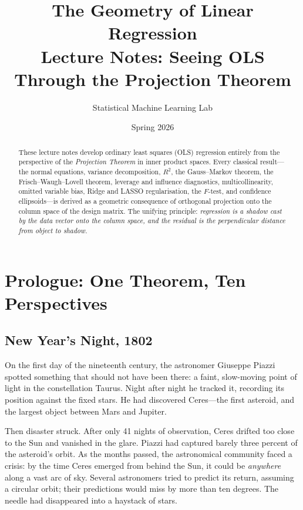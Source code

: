 \documentclass[11pt,a4paper]{article}
\title{%
  \textbf{The Geometry of Linear Regression}\\[6pt]
  \large Lecture Notes: Seeing OLS Through the Projection Theorem\\[4pt]
  \vspace{0.5em}{\large\itshape Supplementary notes for the lecture on linear regression}
}
\author{Statistical Machine Learning Lab}
\date{Spring 2026}
\theoremstyle{plain}
\theoremstyle{definition}
\begin{document}
\maketitle
\thispagestyle{fancy}

\begin{abstract}
These lecture notes develop ordinary least squares (OLS) regression entirely
from the perspective of the \emph{Projection Theorem} in inner product spaces.
Every classical result---the normal equations, variance decomposition,
$R^2$, the Gauss--Markov theorem, the Frisch--Waugh--Lovell theorem,
leverage and influence diagnostics, multicollinearity, omitted variable
bias, Ridge and LASSO regularisation, the $F$-test, and confidence
ellipsoids---is derived as a geometric consequence of orthogonal
projection onto the column space of the design matrix.
The unifying principle: \emph{regression is a shadow cast by the data vector
onto the column space, and the residual is the perpendicular distance from
object to shadow.}
\end{abstract}

\tableofcontents
\newpage

\section{Prologue: One Theorem, Ten Perspectives}

\subsection*{New Year's Night, 1802}

On the first day of the nineteenth century, the astronomer Giuseppe Piazzi
spotted something that should not have been there: a faint, slow-moving
point of light in the constellation Taurus.  Night after night he tracked
it, recording its position against the fixed stars.  He had discovered
Ceres---the first asteroid, and the largest object between Mars and
Jupiter.

Then disaster struck.  After only 41 nights of observation, Ceres
drifted too close to the Sun and vanished in the glare.
Piazzi had captured barely three percent of the asteroid's orbit.  As the
months passed, the astronomical community faced a crisis: by the
time Ceres emerged from behind the Sun, it could be \emph{anywhere} along
a vast arc of sky.  Several astronomers tried to predict its return,
assuming a circular orbit; their predictions would miss by more than ten
degrees.  The needle had disappeared into a haystack of stars.
\end{document}
